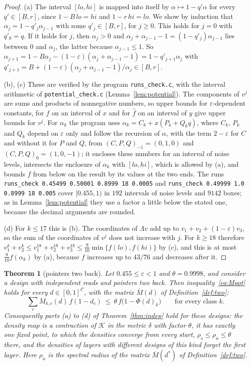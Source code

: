 \documentclass[11pt]{amsart}
\newtheorem{theorem}{Theorem}
\theoremstyle{definition}
\theoremstyle{remark}
\newcommand{\eps}{\varepsilon}
\begin{document}
\begin{proof}
(a) The interval $[lo,hi]$ is mapped into itself by $\alpha\mapsto1-q'\alpha$ for every
$q'\in[B,r]$, since $1-B\,lo=hi$ and $1-r\,hi=lo$. We show by induction that
$\alpha_j=1-q'_j\alpha_{j-1}$ with some $q'_j\in[B,r]$, for $j\ge0$. This holds for $j=0$ with
$q'_0=q$. If it holds for $j$, then $\alpha_j>0$ and
$\alpha_j+\alpha_{j-1}-1=(1-q'_j)\alpha_{j-1}$ lies between $0$ and $\alpha_j$, the latter
because $\alpha_{j-1}\le1$. So
$\alpha_{j+1}=1-B\alpha_j-(1-\eps)(\alpha_j+\alpha_{j-1}-1)=1-q'_{j+1}\alpha_j$ with
$q'_{j+1}=B+(1-\eps)(\alpha_j+\alpha_{j-1}-1)/\alpha_j\in[B,r]$.

(b), (c) These are verified by the program \texttt{runs\_check.c}, with the interval arithmetic
of \texttt{potential\_check.c} (Lemma~\ref{lem:potential}). The components of $v^j$ are sums and
products of nonnegative numbers, so upper bounds for $\eps$-dependent constants, for $f$ on an
interval of $x$ and for $\hat f$ on an interval of $y$ give upper bounds for $v^j$. For
$\alpha_k$ the program uses $\alpha_k=C_k+x(P_k+Q_kq)$, where $C_k$, $P_k$ and $Q_k$ depend on
$\eps$ only and follow the recursion of $\alpha$, with the term $2-\eps$ for $C$ and without it
for $P$ and $Q$, from $(C,P,Q)_{-1}=(0,1,0)$ and $(C,P,Q)_0=(1,0,-1)$; it encloses these
numbers for an interval of noise levels, intersects the enclosure of $\alpha_k$ with $[lo,hi]$,
which is allowed by (a), and bounds $f$ from below on the result by its values at the two ends.
The runs \texttt{runs\_check 0.45499 0.50001 0.8999 18 0.0005} and
\texttt{runs\_check 0.49999 1.0 0.8999 18 0.005} cover $[0.455,1)$ in $192$ intervals of noise
levels and $9142$ boxes; as in Lemma~\ref{lem:potential} they use a factor a little below the
stated one, because the decimal arguments are rounded.

(d) For $k\le17$ this is (b). The coordinates of $\Lambda v$ add up to
$v_1+v_2+(1-\eps)v_3$, so the sum of the coordinates of $v^j$ does not increase with $j$. For
$k\ge18$ therefore $v^k_1+v^k_2\le v^{18}_1+v^{18}_2+v^{18}_3\le\frac9{10}\min\{f(lo),f(hi)\}$
by (c), and this is at most $\frac9{10}f(\alpha_k)$ by (a), because $f$ increases up to
$43/76$ and decreases after it.
\end{proof}

\begin{theorem}[pointers two back]\label{thm:two}
Let $0.455\le\eps<1$ and $\theta=0.9998$, and consider a design with independent reads and
pointers two back. Then inequality~\eqref{eq:Mpot} holds for every $d\in[0,1]^{\mathcal C}$, with
the matrix $\overline M(d)$ of Definition~\ref{def:two}:
\[
\sum_c\overline M_{k,c}(d)\,f(1-d_c)\ \le\ \theta\,f\bigl(1-\Phi(d)_k\bigr)\qquad\text{for every class }k .
\]
Consequently parts (a) to (d) of Theorem~\ref{thm:indep} hold for these designs: the density map
is a contraction of $\mathcal K$ in the metric $\delta$ with factor $\theta$, it has exactly one
fixed point, to which the densities converge from every start, $\rho_s\le\rho_u\le\theta$ there,
and the densities of layers with different designs of this kind forget the first layer. Here
$\rho_u$ is the spectral radius of the matrix $\overline M(d^*)$ of Definition~\ref{def:two}.
\end{theorem}
\end{document}
